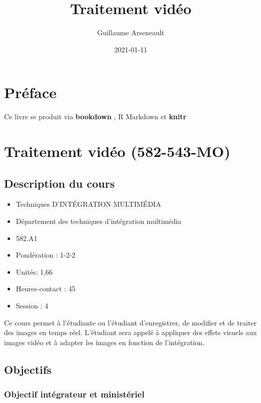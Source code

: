 \documentclass[
]{book}
\title{Traitement vidéo}
\author{Guillaume Arseneault}
\date{2021-01-11}
\providecommand{\tightlist}{%
  \setlength{\itemsep}{0pt}\setlength{\parskip}{0pt}}
\begin{document}
\maketitle

{
\setcounter{tocdepth}{1}
\tableofcontents
}
\listoftables
\listoffigures
\hypertarget{pruxe9face}{%
\chapter{Préface}\label{pruxe9face}}

Ce livre se produit via \textbf{bookdown} \citep{rmarkdown2018}, R Markdown et \textbf{knitr} \citep{xie2015}

\hypertarget{traitement-viduxe9o-582-543-mo}{%
\chapter{Traitement vidéo (582-543-MO)}\label{traitement-viduxe9o-582-543-mo}}

\hypertarget{description-du-cours}{%
\section{Description du cours}\label{description-du-cours}}

\begin{itemize}
\tightlist
\item
  Techniques D'INTÉGRATION MULTIMÉDIA
\item
  Département des techniques d'intégration multimédia
\item
  582.A1
\item
  Pondération : 1-2-2
\item
  Unités: 1,66
\item
  Heures-contact : 45
\item
  Session : 4
\end{itemize}

Ce cours permet à l'étudiante ou l'étudiant d'enregistrer, de modifier et de traiter des images en temps réel.
L'étudiant sera appelé à appliquer des effets visuels aux images vidéo et à adapter les images en fonction de l'intégration.

\hypertarget{objectifs}{%
\section{Objectifs}\label{objectifs}}

\hypertarget{objectif-intuxe9grateur-et-ministuxe9riel}{%
\subsection{Objectif intégrateur et ministériel}\label{objectif-intuxe9grateur-et-ministuxe9riel}}
\end{document}

